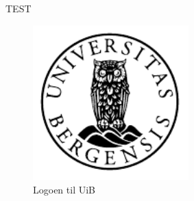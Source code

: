 \documentclass[../main/thesis.tex]{subfiles}
\begin{document}
\newpage
TEST

\begin{figure}[htbp]
	\centering
	\includegraphics[height=6cm]{uib-emblem-svart}
	\caption{Logoen til UiB}
	\label{fig:logo}
\end{figure}

\newpage
\end{document}
